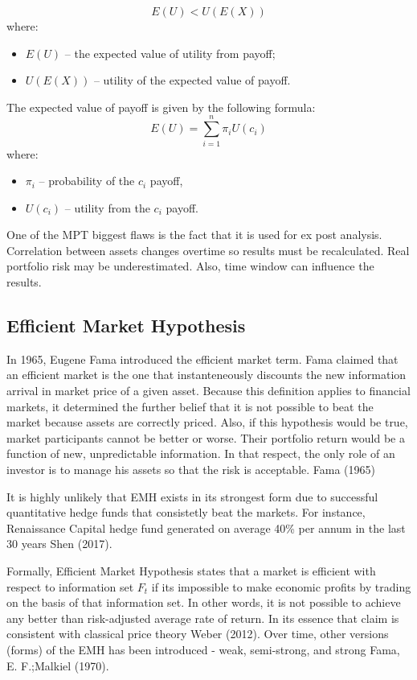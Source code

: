 \documentclass[]{article}
\providecommand{\tightlist}{%
  \setlength{\itemsep}{0pt}\setlength{\parskip}{0pt}}
\begin{document}
\[
E(U)<U(E(X))
\] where:

\begin{itemize}
\tightlist
\item
  \(E(U)\) -- the expected value of utility from payoff;
\item
  \(U(E(X))\) -- utility of the expected value of payoff.
\end{itemize}

The expected value of payoff is given by the following formula: \[
E(U)=\sum_{i=1}^{n}\pi_iU(c_i)
\] where:

\begin{itemize}
\tightlist
\item
  \(\pi_i\) -- probability of the \(c_i\) payoff,
\item
  \(U(c_i)\) -- utility from the \(c_i\) payoff.
\end{itemize}

One of the MPT biggest flaws is the fact that it is used for ex post
analysis. Correlation between assets changes overtime so results must be
recalculated. Real portfolio risk may be underestimated. Also, time
window can influence the results.

\subsection{Efficient Market
Hypothesis}\label{efficient-market-hypothesis}

In 1965, Eugene Fama introduced the efficient market term. Fama claimed
that an efficient market is the one that instanteneously discounts the
new information arrival in market price of a given asset. Because this
definition applies to financial markets, it determined the further
belief that it is not possible to beat the market because assets are
correctly priced. Also, if this hypothesis would be true, market
participants cannot be better or worse. Their portfolio return would be
a function of new, unpredictable information. In that respect, the only
role of an investor is to manage his assets so that the risk is
acceptable. Fama (1965)

It is highly unlikely that EMH exists in its strongest form due to
successful quantitative hedge funds that consistetly beat the markets.
For instance, Renaissance Capital hedge fund generated on average 40\%
per annum in the last 30 years Shen (2017).

Formally, Efficient Market Hypothesis states that a market is efficient
with respect to information set \(F_t\) if its impossible to make
economic profits by trading on the basis of that information set. In
other words, it is not possible to achieve any better than risk-adjusted
average rate of return. In its essence that claim is consistent with
classical price theory Weber (2012). Over time, other versions (forms)
of the EMH has been introduced - weak, semi-strong, and strong Fama, E.
F.;Malkiel (1970).
\end{document}
